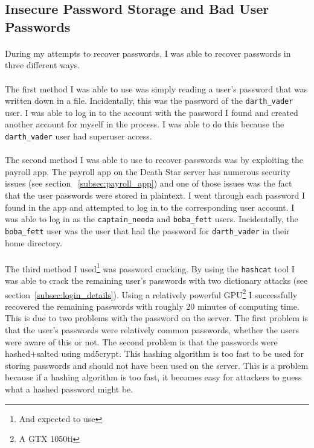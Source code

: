 \documentclass{article}
\begin{document}
\subsection{Insecure Password Storage and Bad User Passwords}
\label{subsec:bad_passwords}
\paragraph{}
During my attempts to recover passwords, I was able to recover passwords in three different ways.

\paragraph{}
The first method I was able to use was simply reading a user's password that was written down in a file. Incidentally, this was the password of the \texttt{darth\_vader} user.
I was able to log in to the account with the password I found and created another account for myself in the process. I was able to do this because the \texttt{darth\_vader} user had superuser access.

\paragraph{}
The second method I was able to use to recover passwords was by exploiting the payroll app.
The payroll app on the Death Star server has numerous security issues (see section ~\ref{subsec:payroll_app}) and one of those issues was the fact that the user passwords were stored in plaintext.
I went through each password I found in the app and attempted to log in to the corresponding user account.
I was able to log in as the \texttt{captain\_needa} and \texttt{boba\_fett} users. Incidentally, the \texttt{boba\_fett} user was the user that had the password for \texttt{darth\_vader} in their home directory.

\paragraph{}
The third method I used\footnote{And expected to use} was password cracking. By using the \texttt{hashcat} tool I was able to crack the remaining user's passwords with two dictionary attacks (see section~\ref{subsec:login_details}).
Using a relatively powerful GPU\footnote{A GTX 1050ti} I successfully recovered the remaining passwords with roughly 20 minutes of computing time.
This is due to two problems with the password on the server.
The first problem is that the user's passwords were relatively common passwords, whether the users were aware of this or not.
The second problem is that the passwords were hashed+salted using md5crypt.
This hashing algorithm is too fast to be used for storing passwords and should not have been used on the server.
This is a problem because if a hashing algorithm is too fast, it becomes easy for attackers to guess what a hashed password might be.
\end{document}
